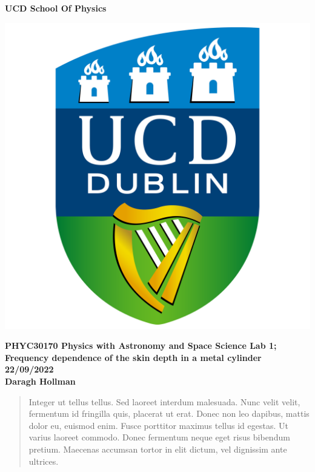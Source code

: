 \documentclass[a4paper,12pt]{article}
\begin{document}
\begin{center}

\thispagestyle{empty}

\Huge{
	\textbf{UCD School Of Physics}
	}
	
\vspace{1cm}	

\includegraphics[scale=0.08]{UCDLogo.png}

\vspace{1cm}

\large{
	\textbf{PHYC30170 Physics with Astronomy and Space Science Lab 1; \\
    Frequency dependence of the skin depth in a metal cylinder \\
    \vspace{1cm}
    22/09/2022 \\
    \vspace{1cm}
    Daragh Hollman}
 } \\

\end{center}

\vspace{1cm}

\newpage

\begin{abstract}
	
	Integer ut tellus tellus. Sed laoreet interdum malesuada. Nunc velit velit, fermentum id fringilla quis, placerat ut erat. Donec non leo dapibus, mattis dolor eu, euismod enim. Fusce porttitor maximus tellus id egestas. Ut varius laoreet commodo. Donec fermentum neque eget risus bibendum pretium. Maecenas accumsan tortor in elit dictum, vel dignissim ante ultrices.
	
\end{abstract}
\end{document}

